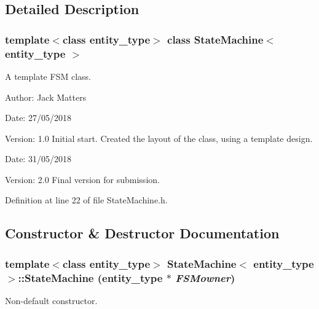 \subsection{Detailed Description}
\subsubsection*{template$<$class entity\_\-type$>$ class StateMachine$<$ entity\_\-type $>$}

A template FSM class. 

\begin{Desc}
\item[Author:]Jack Matters\end{Desc}
\begin{Desc}
\item[Date:]27/05/2018 \end{Desc}
\begin{Desc}
\item[Version:]1.0 Initial start. Created the layout of the class, using a template design.\end{Desc}
\begin{Desc}
\item[Date:]31/05/2018 \end{Desc}
\begin{Desc}
\item[Version:]2.0 Final version for submission. \end{Desc}


Definition at line 22 of file StateMachine.h.

\subsection{Constructor \& Destructor Documentation}
\hypertarget{class_state_machine_4a60d2af8f9977d4f5cf2e9e18b93eae}{
\subsubsection[StateMachine]{\setlength{\rightskip}{0pt plus 5cm}template$<$class entity\_\-type$>$ {\bf StateMachine}$<$ entity\_\-type $>$::{\bf StateMachine} (entity\_\-type $\ast$ {\em FSMowner})}}
\label{class_state_machine_4a60d2af8f9977d4f5cf2e9e18b93eae}


Non-default constructor. 

